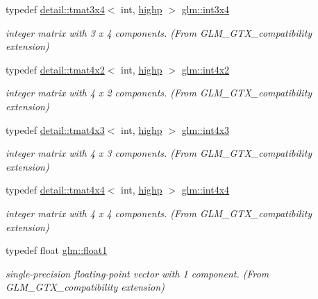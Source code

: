 \begin{DoxyCompactItemize}
typedef \hyperlink{structglm_1_1detail_1_1tmat3x4}{detail\+::tmat3x4}$<$ int, \hyperlink{namespaceglm_a0f04f086094c747d227af4425893f545ac6f7eab42eacbb10d59a58e95e362074}{highp} $>$ \hyperlink{group__gtx__compatibility_ga7cb1c0960d6551c34c666ad5829e9c65}{glm\+::int3x4}
\begin{DoxyCompactList}\small\item\em integer matrix with 3 x 4 components. (From G\+L\+M\+\_\+\+G\+T\+X\+\_\+compatibility extension) \end{DoxyCompactList}\item 
typedef \hyperlink{structglm_1_1detail_1_1tmat4x2}{detail\+::tmat4x2}$<$ int, \hyperlink{namespaceglm_a0f04f086094c747d227af4425893f545ac6f7eab42eacbb10d59a58e95e362074}{highp} $>$ \hyperlink{group__gtx__compatibility_gac391157aca117c5d52b10c2c3ca5c9be}{glm\+::int4x2}
\begin{DoxyCompactList}\small\item\em integer matrix with 4 x 2 components. (From G\+L\+M\+\_\+\+G\+T\+X\+\_\+compatibility extension) \end{DoxyCompactList}\item 
typedef \hyperlink{structglm_1_1detail_1_1tmat4x3}{detail\+::tmat4x3}$<$ int, \hyperlink{namespaceglm_a0f04f086094c747d227af4425893f545ac6f7eab42eacbb10d59a58e95e362074}{highp} $>$ \hyperlink{group__gtx__compatibility_gaa80ec1b785920a08d366b3c09859d888}{glm\+::int4x3}
\begin{DoxyCompactList}\small\item\em integer matrix with 4 x 3 components. (From G\+L\+M\+\_\+\+G\+T\+X\+\_\+compatibility extension) \end{DoxyCompactList}\item 
typedef \hyperlink{structglm_1_1detail_1_1tmat4x4}{detail\+::tmat4x4}$<$ int, \hyperlink{namespaceglm_a0f04f086094c747d227af4425893f545ac6f7eab42eacbb10d59a58e95e362074}{highp} $>$ \hyperlink{group__gtx__compatibility_ga5f8072c2dce67ad49939e12b168d1de1}{glm\+::int4x4}
\begin{DoxyCompactList}\small\item\em integer matrix with 4 x 4 components. (From G\+L\+M\+\_\+\+G\+T\+X\+\_\+compatibility extension) \end{DoxyCompactList}\item 
typedef float \hyperlink{group__gtx__compatibility_gae0ad1b0450320cda98bbbecb56bc3167}{glm\+::float1}
\begin{DoxyCompactList}\small\item\em single-\/precision floating-\/point vector with 1 component. (From G\+L\+M\+\_\+\+G\+T\+X\+\_\+compatibility extension) \end{DoxyCompactList}\item 

\end{DoxyCompactItemize}
